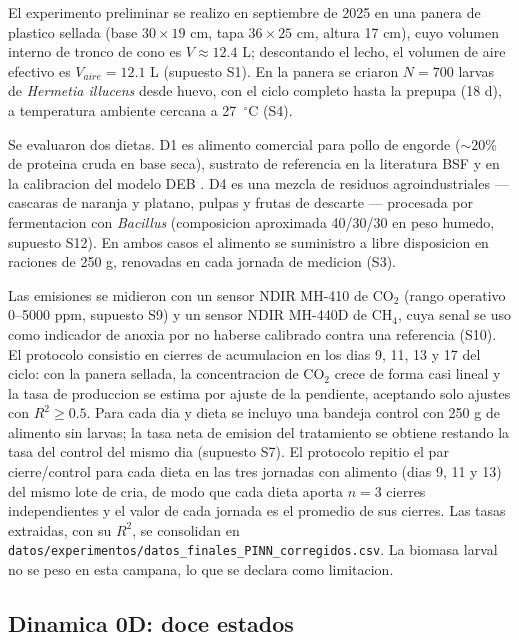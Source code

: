 El experimento preliminar se realizo en septiembre de 2025 en una panera
de plastico sellada (base $30 \times 19$ cm, tapa $36 \times 25$ cm,
altura 17 cm), cuyo volumen interno de tronco de cono es
$V \approx 12.4$ L; descontando el lecho, el volumen de aire efectivo es
$V_{aire} = 12.1$ L (supuesto S1). En la panera se criaron $N = 700$
larvas de \emph{Hermetia illucens} desde huevo, con el ciclo completo
hasta la prepupa (18 d), a temperatura ambiente cercana a 27~$^{\circ}$C
(S4).

Se evaluaron dos dietas. D1 es alimento comercial para pollo de
engorde ($\sim 20\%$ de proteina cruda en base seca), sustrato de
referencia en la literatura BSF y en la calibracion del modelo DEB
\parencite{eriksenDynamicModellingFeed2022,
eriksenMetabolicPerformanceFeed2024}. D4 es una mezcla de residuos
agroindustriales --- cascaras de naranja y platano, pulpas y frutas
de descarte --- procesada por fermentacion con \emph{Bacillus}
(composicion aproximada 40/30/30 en peso humedo, supuesto S12).
En ambos casos el alimento se suministro a libre
disposicion en raciones de 250 g, renovadas en cada jornada de medicion
(S3).

Las emisiones se midieron con un sensor NDIR MH-410 de CO$_2$ (rango
operativo 0--5000 ppm, supuesto S9) y un sensor NDIR MH-440D de
CH$_4$, cuya senal se uso como indicador de anoxia por no haberse
calibrado contra una referencia (S10). El protocolo consistio
en cierres de acumulacion en los dias 9, 11, 13 y 17 del ciclo: con la
panera sellada, la concentracion de CO$_2$ crece de forma casi lineal
y la tasa de produccion se estima por ajuste de la pendiente, aceptando
solo ajustes con $R^2 \geq 0.5$. Para cada dia y dieta se incluyo una
bandeja control con 250 g de alimento sin larvas; la tasa neta de
emision del tratamiento se obtiene restando la tasa del control del
mismo dia (supuesto S7). El protocolo repitio el par cierre/control para cada dieta en las tres jornadas con alimento (dias 9, 11 y 13) del mismo lote de cria, de modo que cada dieta aporta $n = 3$ cierres independientes y el valor de cada jornada es el promedio de sus cierres. Las tasas extraidas, con su $R^2$, se
consolidan en
\texttt{datos/experimentos/datos\_finales\_PINN\_corregidos.csv}.
La biomasa larval no se peso en esta campana, lo que se declara como
limitacion.

\subsection{Dinamica 0D: doce estados}
\label{sec:dinamica0d}

